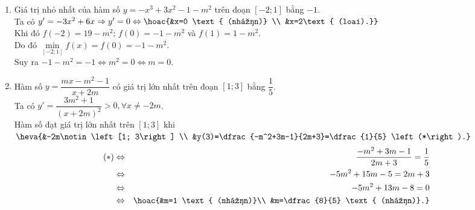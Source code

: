 \begin{bt}
{\begin{enumerate}
			Do đó  ${\mathop{\max}\limits_{\left[0; 2\right]}} y+{\mathop{\min}\limits_{\left[0; 2\right]}} y=-\dfrac{m}{2}+\dfrac{2-m}{4}=\dfrac{-3m+2}{4}$.\\
			Từ giả thiết  suy ra $\dfrac{-3m+2}{4}=8\Leftrightarrow-3m+2=32\Leftrightarrow m=-10$.
			\item Giá trị nhỏ nhất của hàm số $y=-x^3+3x^2-1-m^2$ trên đoạn  $\left[-2;1\right]$ bằng $-1$.
			\\ 
			Ta có $y'=-3x^2+6x\Rightarrow y'=0\Leftrightarrow \hoac{&x=0 \text{ (nhận)}  \\ &x=2\text{ (loai).}}$\\
			Khi đó $f\left(-2\right)=19-m^2$; $f(0)=-1-m^2$ và $f(1)=1-m^2$.\\ 
			Do đó ${\mathop{\min}\limits_{\left[-2;1\right]}}  f(x)=f(0)=-1-m^2$.\\
			Suy ra  $-1-m^2=-1\Leftrightarrow m^2=0\Leftrightarrow m=0$.
			\item Hàm  số $y=\dfrac{mx-m^2-1}{x+2m}$ có giá trị lớn nhất trên đoạn $\left[1;3\right]$ bằng $\dfrac{1}{5}$.\\
			Ta có $y'=\dfrac{3m^2+1}{\left(x+2m\right)^2} > 0, \forall x\ne-2m$.\\ 
			Hàm số đạt giá trị lớn nhất trên $\left[1;  3\right]$ khi $\heva{&-2m\notin \left[1; 3\right] \\ &y(3)=\dfrac{-m^2+3m-1}{2m+3}=\dfrac{1}{5} \left(*\right).} $
			\begin{eqnarray*}
				\left(*\right) & \Leftrightarrow & \dfrac{-m^2+3m-1}{2m+3}=\dfrac{1}{5}\\ & \Leftrightarrow &-5m^2+15m-5=2m+3 \\ &\Leftrightarrow  &-5m^2+13m-8=0 \\ & \Leftrightarrow & \hoac{&m=1 \text{ (nhận)}\\ &m=\dfrac{8}{5} \text{ (nhận)}.}
			\end{eqnarray*}
		\end{enumerate}
	 }
\end{bt}

